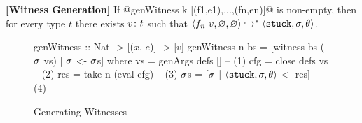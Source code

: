 \begin{cor}{\textbf{[Witness Generation]}}
\label{thm:generation}
  If @genWitness k [(f1,e1),...,(fn,en)]@ is non-empty,
  then for every type $t$ there exists ${v} \colon {t}$ such that
  $\langle f_n\ v, \varnothing, \varnothing \rangle \hookrightarrow^{*} \langle \mathtt{stuck}, \sigma, \theta \rangle$.
\end{cor}

\begin{figure}[t]
\centering
\begin{mcode}
genWitness :: Nat -> [($x$, $e$)] -> [$v$]
genWitness n bs
       = [witness bs ($\sigma$ vs) | $\sigma$ <- $\sigma$s]
  where
   vs  = genArgs defs []        -- (1)
   cfg = close defs vs          -- (2)
   res = take n (eval cfg)      -- (3)
   $\sigma$s   = [$\sigma$ | $\langle \mathtt{stuck}, \sigma, \theta \rangle$ <- res]  -- (4)
\end{mcode}
\caption{Generating Witnesses}
\label{fig:algo-gen-witness}
\end{figure}


